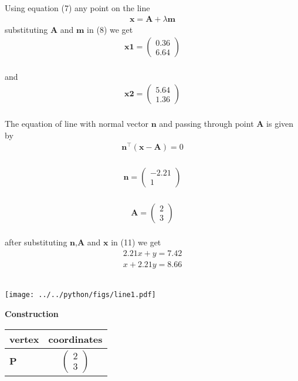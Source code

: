 \documentclass[10pt,a4paper]{report}
\newcommand{\myvec}[1]{\ensuremath{\begin{pmatrix}#1\end{pmatrix}}}
\let\vec\mathbf
\let\vec\mathbf
\providecommand{\brak}[1]{\ensuremath{\left(#1\right)}}
\begin{document}
\begin{multicols}{2}
Using equation (7) any point on the line  
 \begin{align}
	\label{eq:dir_line}
	\vec{x} = \vec{A} + \lambda \vec{m}
\end{align}
\vspace{2mm}
substituting $\vec{A}$ and $\vec{m}$ in (8) we get\\
\vspace{1mm}
\begin{align}
	\label{eq:dir_line}
	\vec{x1} = \myvec{
	0.36\\
	6.64
	}
\end{align}\\
and
\begin{align}
	\label{eq:dir_line}
	\vec{x2} = \myvec{
	5.64\\
	1.36
	}
\end{align}\\
The equation of line with normal vector $\vec{n}$ and passing through point $\vec{A}$ is given by
\begin{align}
    \label{eq:line_norm_eq}
	\vec{n}^{\top}\brak{\vec{x}-\vec{A}} =0 
\end{align}\\
\vspace{3mm}
\begin{align}
	\label{eq:dir_line}
	\vec{n} = \myvec{
	-2.21\\
	1
	}
\end{align}\\
\begin{align}
	\label{eq:dir_line}
	\vec{A} = \myvec{
	2\\
	3
	}
\end{align}\\
after substituting $\vec{n}$,$\vec{A}$ and $\vec{x}$ in (11) we get
\begin{align}
2.21x+y=7.42
\end{align}
\begin{align}
x+2.21y=8.66
\end{align}\\

\begin{center}
\texttt{[image: ../../python/figs/line1.pdf]} 
 \end{center}\vspace{1mm}
 
 \vspace{2mm} \textbf{Construction}
\begin{center}
\setlength{\arrayrulewidth}{0.5mm}
\setlength{\tabcolsep}{6pt}
\renewcommand{\arraystretch}{1.5}
    \begin{tabular}{|l|c|}
    \hline 
    \textbf{vertex} & \textbf{coordinates} \\ \hline
   $\vec{P}$ & $\myvec{
   2\\
   3
   } $ \\\hline
  

\end{tabular}
\end{center}
\end{multicols}
\end{document}

